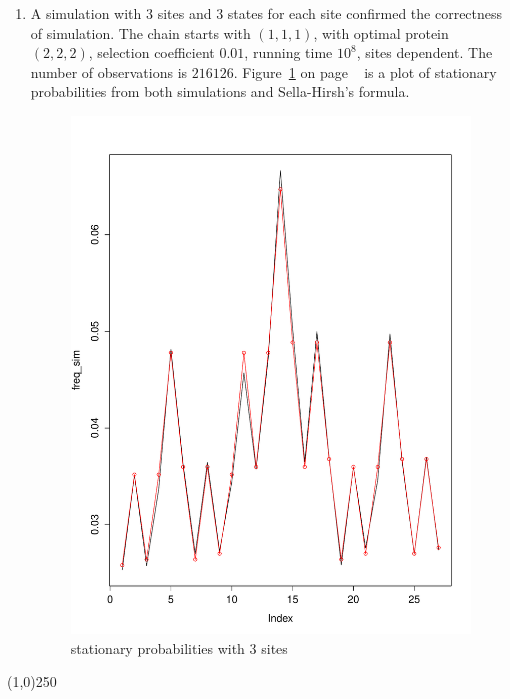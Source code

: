 \documentclass[13pt]{article}
\begin{document}
\begin{enumerate}
\item A simulation with 3 sites and 3 states for each site confirmed the correctness of simulation. The chain starts with $(1,1,1)$, with optimal protein $(2,2,2)$, selection coefficient $0.01$, running time $10^8$, sites dependent. The number of observations is $216126$. Figure~\ref{fig:freq3sites} on page ~\pageref{fig:freq3sites} is a plot of stationary probabilities from both simulations and Sella-Hirsh's formula.
\begin{figure}[here]
\centering
\includegraphics[scale=0.3]{3sites3states.pdf}
\caption{stationary probabilities with 3 sites}
\label{fig:freq3sites}
\end{figure}

\end{enumerate}

\begin{center}
\line(1,0){250}
\end{center}
\end{document}
